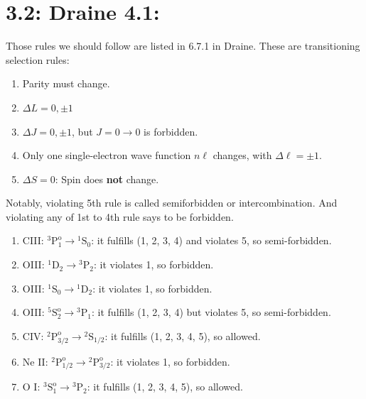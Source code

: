 \documentclass[12pt,letterpaper]{article}
\newcommand{\mt}{\mathrm}
\begin{document}
\section*{3.2: Draine 4.1:}
Those rules we should follow are listed in 6.7.1 in Draine.
These are transitioning selection rules:
\begin{enumerate}
    \item Parity must change.
    \item $\Delta L = 0, \pm 1$
    \item $\Delta J = 0, \pm 1$, but $J = 0 \rightarrow 0$ is forbidden.
    \item Only one single-electron wave function $n\ell$ changes, with $\Delta \ell = \pm 1$.
    \item $\Delta S = 0$: Spin does {\bf not} change.
\end{enumerate}

Notably, violating 5th rule is called semiforbidden or intercombination.
And violating any of 1st to 4th rule says to be forbidden.

\begin{enumerate}
    \item CIII: $^3{\mt P}^{\mt o}_1 \rightarrow {^1}{\mt S}_0$: it fulfills (1, 2, 3, 4) and violates 5, so semi-forbidden.
    \item OIII: ${^1}{\mt D}_2 \rightarrow {^3}{\mt P}_2$: it violates 1, so forbidden.
    \item OIII: ${^1}{\mt S}_0 \rightarrow {^1}{\mt D}_2$: it violates 1, so forbidden.
    \item OIII: ${^5}{\mt S}^{\mt o}_2 \rightarrow {^3}{\mt P}_1$: it fulfills (1, 2, 3, 4) but violates 5, so semi-forbidden.
    \item CIV: ${^2}{\mt P}^{\mt o}_{3/2} \rightarrow {^2}{\mt S}_{1/2}$: it fulfills (1, 2, 3, 4, 5), so allowed.
    \item Ne II: ${^2}{\mt P}^{\mt o}_{1/2} \rightarrow {^2}{\mt P}^{\mt o}_{3/2}$: it violates 1, so forbidden.
    \item O I: ${^3}{\mt S}^{\mt o}_1 \rightarrow {^3}{\mt P}_2$: it fulfills (1, 2, 3, 4, 5), so allowed.
\end{enumerate}
\end{document}
